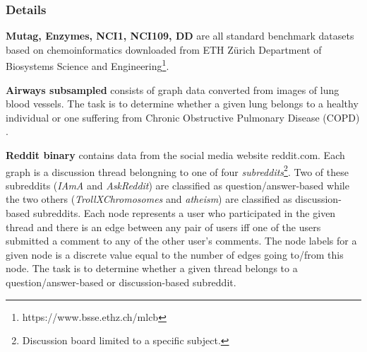 \documentclass{article}
\begin{document}
\begin{table}[H]
		\centering
		\hspace*{-0.7in}
	\caption{\textit{Dataset specifications}}
	\label{table:data-sets}
\end{table}

\subsubsection{Details}
\textbf{Mutag, Enzymes, NCI1, NCI109, DD} are all standard benchmark datasets based on chemoinformatics downloaded from ETH Zürich Department of Biosystems Science and Engineering\footnote{https://www.bsse.ethz.ch/mlcb}.

\textbf{Airways subsampled} consists of graph data converted from images of lung blood vessels. The task is to determine whether a given lung belongs to a healthy individual or one suffering from Chronic Obstructive Pulmonary Disease (COPD) \cite{graphhopper}.

\textbf{Reddit binary} \cite{yanardag} contains data from the social media website reddit.com. Each graph is a discussion thread belongning to one of four \textit{subreddits}\footnote{Discussion board limited to a specific subject.}. Two of these subreddits (\textit{IAmA} and \textit{AskReddit}) are classified as question/answer-based while the two others (\textit{TrollXChromosomes} and \textit{atheism}) are classified as discussion-based subreddits. Each node represents a user who participated in the given thread and there is an edge between any pair of users iff one of the users submitted a comment to any of the other user's comments. The node labels for a given node is a discrete value equal to the number of edges going to/from this node. The task is to determine whether a given thread belongs to a question/answer-based or discussion-based subreddit.
\end{document}
